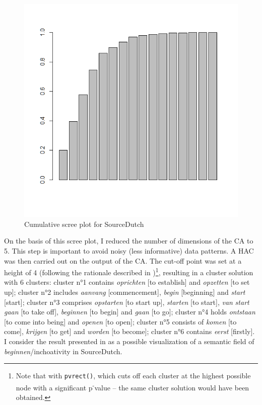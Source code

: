 \begin{figure}
\includegraphics[height=.4\textheight]{figures/Vandevoorde2-img51.png}
\caption{\label{fig:4:51}  Cumulative scree plot for SourceDutch}
\end{figure}

On the basis of this scree plot, I reduced the number of dimensions of the CA to 5. This step is important to avoid noisy (less informative) data patterns. A HAC was then carried out on the output of the CA. The cut-off point was set at a height of 4 (following the rationale described in )\footnote{Note that with \texttt{pvrect()}, which cuts off each cluster at the highest possible node with a significant p\textsuperscript{{}-}value – the same cluster solution would have been obtained.}, resulting in a cluster solution with 6 clusters: cluster n°1 contains \textit{oprichten} [to establish] and \textit{opzetten} [to set up]; cluster n°2 includes \textit{aanvang} [commencement], \textit{begin} [beginning] and \textit{start} [start]; cluster n°3 comprises \textit{opstarten} [to start up], \textit{starten} [to start], \textit{van} \textit{start} \textit{gaan} [to take off], \textit{beginnen} [to begin] and \textit{gaan} [to go]; cluster n°4 holds \textit{ontstaan} [to come into being] and \textit{openen} [to open]; cluster n°5 consists of \textit{komen} [to come], \textit{krijgen} [to get] and \textit{worden} [to become]; cluster n°6 contains \textit{eerst} [firstly]. I consider the result presented in  as a possible visualization of a semantic field of \textit{beginnen}/inchoativity in SourceDutch.

